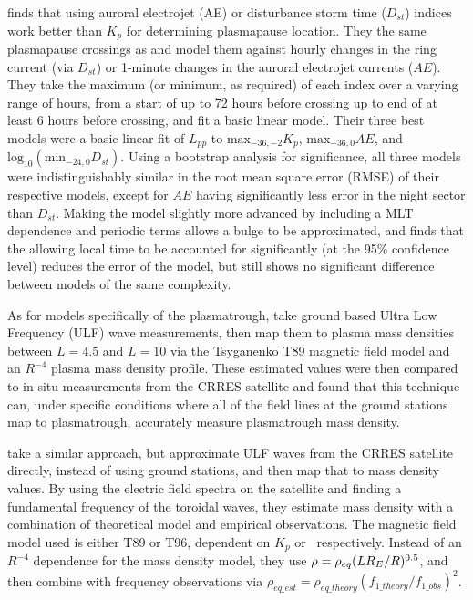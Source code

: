 \cite{OBrien2003EmpiricalPlasmapause} finds that using auroral electrojet (AE) or disturbance storm time ($D_{st}$) indices work better than $K_p$ for determining plasmapause location. They the same plasmapause crossings as \citep{Moldwin2002ModelPlasmapause} and model them against hourly changes in the ring current (via $D_{st}$) or 1-minute changes in the auroral electrojet currents ($AE$). They take the maximum (or minimum, as required) of each index over a varying range of hours, from a start of up to 72 hours before crossing up to end of at least 6 hours before crossing, and fit a basic linear model. Their three best models were a basic linear fit of $L_{pp}$ to $\text{max}_{-36,-2}K_p$, $\text{max}_{-36,0}AE$, and $\text{log}_{10}(\text{min}_{-24,0}D_{st})$. Using a bootstrap analysis for significance, all three models were indistinguishably similar in the root mean square error (RMSE) of their respective models, except for $AE$ having significantly less error in the night sector than $D_{st}$. Making the model slightly more advanced by including a MLT dependence and periodic terms allows a bulge to be approximated, and finds that the allowing local time to be accounted for significantly (at the 95\% confidence level) reduces the error of the model, but still shows no significant difference between models of the same complexity.

As for models specifically of the plasmatrough, \cite{Lotoaniu1999PlasmaMassDensity} take ground based Ultra Low Frequency (ULF) wave measurements, then map them to plasma mass densities between $L=4.5$ and $L=10$ via the Tsyganenko T89 magnetic field model and an $R^{-4}$ plasma mass density profile. These estimated values were then compared to in-situ measurements from the CRRES satellite and found that this technique can, under specific conditions where all of the field lines at the ground stations map to plasmatrough, accurately measure plasmatrough mass density. 

\cite{Takahashi2006MassDensityInferred} take a similar approach, but approximate ULF waves from the CRRES satellite directly, instead of using ground stations, and then map that to mass density values. By using the electric field spectra on the satellite and finding a fundamental frequency of the toroidal waves, they estimate mass density with a combination of theoretical model and empirical observations. The magnetic field model used is either T89 or T96, dependent on $K_p$ or \dst\  respectively. Instead of an $R^{-4}$ dependence for the mass density model, they use $\rho=\rho_{eq}(LR_E/R)^{0.5}$, and then combine with frequency observations via $\rho_{eq\_est}=\rho_{eq\_theory}(f_{1\_theory}/f_{1\_obs})^2$.

